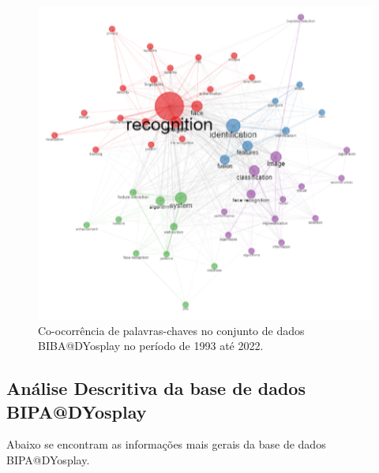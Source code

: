 \begin{figure}[H]
    \centering
    \includegraphics[width=1\textwidth]{experiments/DYosplay/PesquisaBibliometrica/Imagens/BIPA@DYosplay_CoOcurrenceNetwork1993-2022.png}
    \caption{Co-ocorrência de palavras-chaves no conjunto de dados BIBA@DYosplay no período de 1993 até 2022.}
    \label{fig:CoOcurrence1993-2022:BIPA@DYosplay}
\end{figure}


\subsection{Análise Descritiva da base de dados BIPA@DYosplay}

Abaixo se encontram as informações mais gerais da base de dados BIPA@DYosplay.

